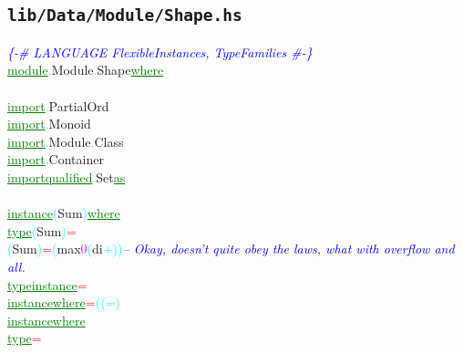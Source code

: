 \subsection{\texttt{lib/Data/Module/Shape.hs}}
\label{mod:Data.Module.Shape}
\textcolor{blue}{{\it{}\{-\# LANGUAGE FlexibleInstances, TypeFamilies \#-\}}}\\\textcolor{green}{\underline{module}}\textcolor{cyan}{.}{\rm{}Module}\textcolor{cyan}{.}{\rm{}Shape}\hsspace \textcolor{green}{\underline{where}}\\\\\textcolor{green}{\underline{import}}\textcolor{cyan}{.}{\rm{}PartialOrd}\\\textcolor{green}{\underline{import}}\textcolor{cyan}{.}{\rm{}Monoid}\\\textcolor{green}{\underline{import}}\textcolor{cyan}{.}{\rm{}Module}\textcolor{cyan}{.}{\rm{}Class}\\\textcolor{green}{\underline{import}}\textcolor{cyan}{.}{\rm{}Container}\\\textcolor{green}{\underline{import}}\hsspace \textcolor{green}{\underline{qualified}}\textcolor{cyan}{.}{\rm{}Set}\hsspace \textcolor{green}{\underline{as}}\\\\\textcolor{green}{\underline{instance}}\hsspace \textcolor{cyan}{(}{\rm{}Sum}\textcolor{cyan}{)}\hsspace \textcolor{green}{\underline{where}}\\\hstab \textcolor{green}{\underline{type}}\hsspace \textcolor{cyan}{(}{\rm{}Sum}\textcolor{cyan}{)}\hsspace \textcolor{red}{=}\\\hsspace \textcolor{cyan}{(}{\rm{}Sum}\textcolor{cyan}{)}\hsspace \textcolor{red}{=}\hsspace \textcolor{cyan}{(}{\rm{}max}\hsspace \textcolor{magenta}{0}\hsspace \textcolor{cyan}{(}{\rm{}di}\hsspace \textcolor{cyan}{+}\textcolor{cyan}{)}\textcolor{cyan}{)}\hsspace \textcolor{blue}{{\it{}-- Okay, doesn't quite obey the laws, what with overflow and all.}}\\\textcolor{green}{\underline{type}}\hsspace \textcolor{green}{\underline{instance}}\hsspace \textcolor{red}{=}\\\textcolor{green}{\underline{instance}}\hsspace \textcolor{green}{\underline{where}}\hsspace \textcolor{red}{=}\hsspace \textcolor{cyan}{(}\textcolor{cyan}{\ensuremath{\langle}=}\textcolor{cyan}{)}\\\textcolor{green}{\underline{instance}}\hsspace \textcolor{green}{\underline{where}}\\\hstab \textcolor{green}{\underline{type}}\hsspace \textcolor{red}{=}\\\hsspace 